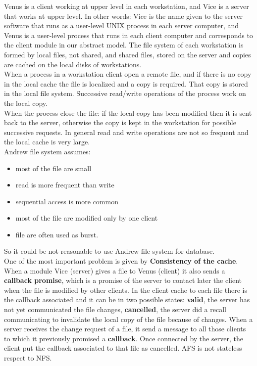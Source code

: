 Venus is a client working at upper level in each workstation, and Vice is a server that works at upper level. In other words: Vice is the name given to the server software that runs as a user-level UNIX process in each server computer, and Venus is a user-level process that runs in each client computer and corresponds to the client module in our abstract model. The file system of each workstation is formed by local files, not shared, and shared files, stored on the server and copies are cached on the local disks of workstations.\\
When a process in a workstation client open a remote file, and if there is no copy in the local cache the file is localized and a copy is required. That copy is stored in the local file system.
Successive read/write operations of the process work on the local copy.\\
When the process close the file: if the local copy has been modified  then it is sent back to the server, otherwise the copy is kept in the workstation for possible successive requests. In general read and write operations are not so frequent and the local cache is very large.\\
Andrew file system assumes:
\begin{itemize}
	\item most of the file are small
	\item read is more frequent than write
	\item sequential access is more common
	\item most of the file are modified only by one client 
	\item file are often used as burst.
\end{itemize}
So it could be not reasonable to use Andrew file system for database.\\
One of the most important problem is given by \textbf{Consistency of the cache}. When a module Vice (server) gives a file to Venus (client) it also sends a \textbf{callback promise}, which is a promise of the server to contact later the client when the file is modified by other clients. In the client cache to each file there is the callback associated and it can be in two possible states: \textbf{valid}, the server has not yet communicated the file changes, \textbf{cancelled}, the server did a recall communicating to invalidate the local copy of the file because of changes.
When a server receives the change request of a file, it send a message to all those clients to which it previously promised a \textbf{callback}. Once connected by the server, the client put the callback associated to that file as cancelled. AFS is not stateless respect to NFS. \\

